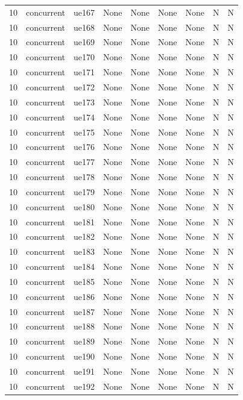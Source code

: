 \begin{table}[ht]
\begin{tabular}{|c|c|c|c|c|c|c|c|c|}
10 & concurrent & ue167 & None & None & None & None & N & N \\
10 & concurrent & ue168 & None & None & None & None & N & N \\
10 & concurrent & ue169 & None & None & None & None & N & N \\
10 & concurrent & ue170 & None & None & None & None & N & N \\
10 & concurrent & ue171 & None & None & None & None & N & N \\
10 & concurrent & ue172 & None & None & None & None & N & N \\
10 & concurrent & ue173 & None & None & None & None & N & N \\
10 & concurrent & ue174 & None & None & None & None & N & N \\
10 & concurrent & ue175 & None & None & None & None & N & N \\
10 & concurrent & ue176 & None & None & None & None & N & N \\
10 & concurrent & ue177 & None & None & None & None & N & N \\
10 & concurrent & ue178 & None & None & None & None & N & N \\
10 & concurrent & ue179 & None & None & None & None & N & N \\
10 & concurrent & ue180 & None & None & None & None & N & N \\
10 & concurrent & ue181 & None & None & None & None & N & N \\
10 & concurrent & ue182 & None & None & None & None & N & N \\
10 & concurrent & ue183 & None & None & None & None & N & N \\
10 & concurrent & ue184 & None & None & None & None & N & N \\
10 & concurrent & ue185 & None & None & None & None & N & N \\
10 & concurrent & ue186 & None & None & None & None & N & N \\
10 & concurrent & ue187 & None & None & None & None & N & N \\
10 & concurrent & ue188 & None & None & None & None & N & N \\
10 & concurrent & ue189 & None & None & None & None & N & N \\
10 & concurrent & ue190 & None & None & None & None & N & N \\
10 & concurrent & ue191 & None & None & None & None & N & N \\
10 & concurrent & ue192 & None & None & None & None & N & N \\

\end{tabular}
\end{table}
